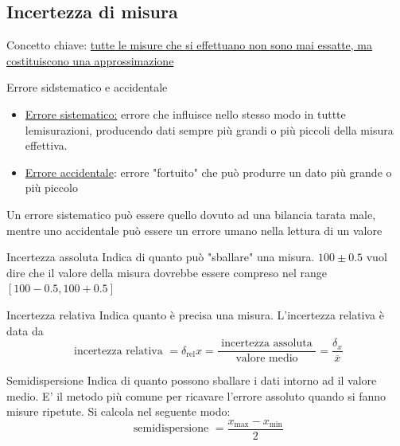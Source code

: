 \subsection{Incertezza di misura}
Concetto chiave: \underline{tutte le misure che si effettuano non sono mai essatte, ma costituiscono una approssimazione}
\begin{definizione}{Errore sidstematico e accidentale}
	\begin{itemize}
		\item \underline{Errore sistematico:} errore che influisce nello stesso modo in tuttte lemisurazioni, producendo dati sempre più grandi o più piccoli della misura effettiva.
		\item \underline{Errore accidentale}: errore "fortuito" che può produrre un dato più grande o più piccolo
	\end{itemize}
\end{definizione}
Un errore sistematico può essere quello dovuto ad una bilancia tarata male, mentre uno accidentale può essere un errore umano nella lettura di un valore
\begin{definizione}{Incertezza assoluta}
	Indica di quanto può "sballare" una misura.
	\vskip3mm
	$ 100 \pm 0.5 $ vuol dire che il valore della misura dovrebbe essere compreso nel range $ \left[100 - 0.5, 100+0.5\right] $
\end{definizione}
\begin{definizione}{Incertezza relativa}
	Indica quanto è precisa una misura. L'incertezza relativa è data da
	\[
		\text{ incertezza relativa }=\delta_{\text{rel}}x = \frac{\text{ incertezza assoluta }}{\text{ valore medio }} = \frac{\delta _x}{\overline{x}}
	\]
\end{definizione}
\begin{definizione}{Semidispersione}
	Indica di quanto possono sballare i dati intorno ad il valore medio. E' il metodo più comune per ricavare l'errore assoluto quando si fanno misure ripetute. Si calcola nel seguente modo:
	\[
		\text{ semidispersione } = \frac{x_{\text{max}} - x_{\text{min}}}{2}
	\]
\end{definizione}
